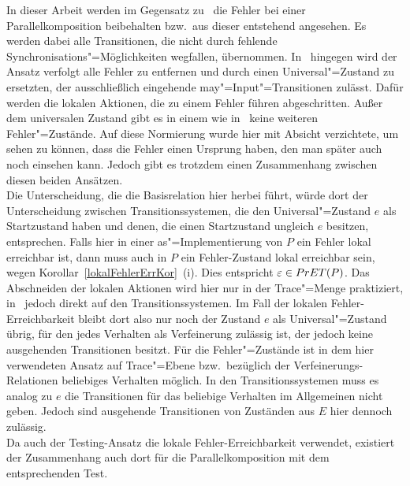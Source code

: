 In dieser Arbeit werden im Gegensatz zu~\cite{Vogler2016MIA3} die Fehler bei
einer Parallelkomposition beibehalten bzw.\ aus dieser entstehend angesehen. Es
werden dabei alle Transitionen, die nicht durch fehlende
Synchronisations"=Möglichkeiten wegfallen, übernommen. In~\cite{Vogler2016MIA3}
hingegen wird der Ansatz verfolgt alle Fehler zu entfernen und durch einen
Universal"=Zustand zu ersetzten, der ausschließlich eingehende
may"=Input"=Transitionen zulässt. Dafür werden die lokalen Aktionen, die zu
einem Fehler führen abgeschritten. Außer dem universalen Zustand gibt es in
einem \MIA{} wie in~\cite{Vogler2016MIA3} keine weiteren Fehler"=Zustände. Auf
diese Normierung wurde hier mit Absicht verzichtete, um sehen zu können, dass
die Fehler einen Ursprung haben, den man später auch noch einsehen kann. Jedoch
gibt es trotzdem einen Zusammenhang zwischen diesen beiden Ansätzen.\\
Die Unterscheidung, die die Basisrelation \EBRel{} hier herbei führt, würde
dort der Unterscheidung zwischen Transitionssystemen, die den
Universal"=Zustand $e$ als Startzustand haben und denen, die einen Startzustand
ungleich $e$ besitzen, entsprechen. Falls hier in einer as"=Implementierung von
$P$ ein Fehler lokal erreichbar ist, dann muss auch in $P$ ein Fehler-Zustand
lokal erreichbar sein, wegen Korollar~\ref{lokalFehlerErrKor}~(i). Dies
entspricht $\varepsilon \in PrET (P)$. Das Abschneiden der lokalen Aktionen
wird hier nur in der Trace"=Menge praktiziert, in~\cite{Vogler2016MIA3} jedoch
direkt auf den Transitionssystemen. Im Fall der lokalen Fehler-Erreichbarkeit
bleibt dort also nur noch der Zustand $e$ als Universal"=Zustand übrig, für den
jedes Verhalten als Verfeinerung zulässig ist, der jedoch keine ausgehenden
Transitionen besitzt. Für die Fehler"=Zustände ist in dem hier verwendeten
Ansatz auf Trace"=Ebene bzw.\ bezüglich der Verfeinerungs-Relationen beliebiges
Verhalten möglich. In den Transitionssystemen muss es analog zu $e$ die
Transitionen für das beliebige Verhalten im Allgemeinen nicht geben. Jedoch
sind ausgehende Transitionen von Zuständen aus $E$ hier dennoch zulässig.\\
Da auch der Testing-Ansatz die lokale Fehler-Erreichbarkeit verwendet,
existiert der Zusammenhang auch dort für die Parallelkomposition mit dem
entsprechenden Test.

